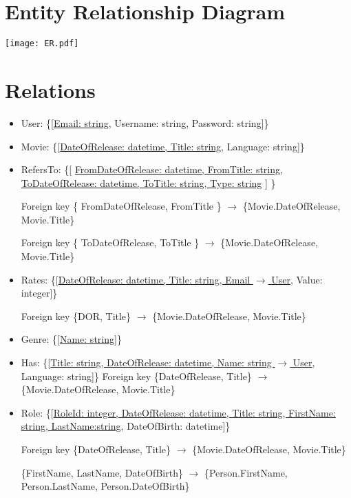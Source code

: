 \section{Entity Relationship Diagram}

\texttt{[image: ER.pdf]}

\section{Relations}
\begin{itemize}
\item User: \{[\underline{Email: string}, Username: string, Password: string]\}

\item Movie: \{[\underline{DateOfRelease: datetime, Title: string}, Language: string]\}

\item RefersTo: \{[ \underline{FromDateOfRelease: datetime, FromTitle: string, ToDateOfRelease: datetime, ToTitle: string, Type: string} ] \}

	Foreign key \{ FromDateOfRelease, FromTitle \} $ \rightarrow $ \{Movie.DateOfRelease, Movie.Title\}
	
	Foreign key \{ ToDateOfRelease, ToTitle \} $ \rightarrow $ \{Movie.DateOfRelease, Movie.Title\}

\item Rates: \{[\underline{DateOfRelease: datetime, Title: string, Email $ \rightarrow $ User}, Value: integer]\}

Foreign key \{DOR, Title\}  $ \rightarrow $ \{Movie.DateOfRelease, Movie.Title\}

\item Genre: \{[\underline{Name: string}]\}

\item Has: \{[\underline{Title: string, DateOfRelease: datetime, Name: string $ \rightarrow $ User}, Language: string]\}
	Foreign key \{DateOfRelease, Title\} $ \rightarrow $ \{Movie.DateOfRelease, Movie.Title\}

\item Role: \{[\underline{RoleId: integer, DateOfRelease: datetime, Title: string, FirstName: string, LastName:string}, DateOfBirth: datetime]\}

Foreign key \{DateOfRelease, Title\} $ \rightarrow $ \{Movie.DateOfRelease, Movie.Title\}

\{FirstName, LastName, DateOfBirth\} $ \rightarrow $ \{Person.FirstName, Person.LastName, Person.DateOfBirth\}


\end{itemize}
